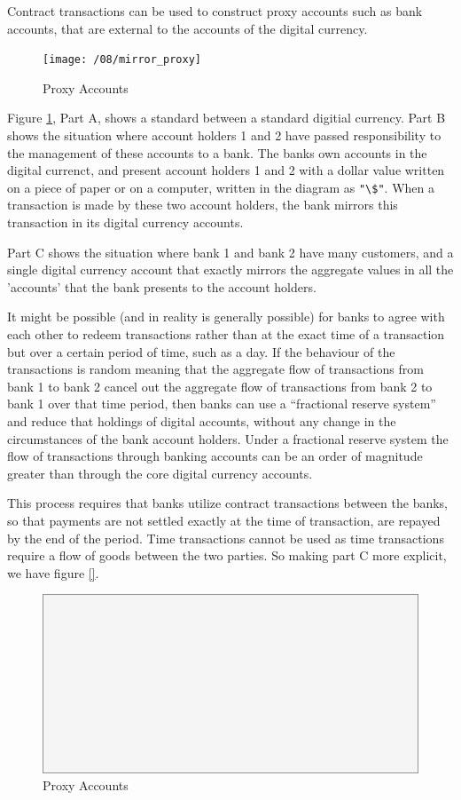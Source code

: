 Contract transactions can be used to construct proxy accounts such as bank accounts, that are
external to the accounts of the digital currency.

\begin{figure}[H]
\centering
\texttt{[image: /08/mirror\_proxy]}
\caption{Proxy Accounts}
\label{fig:mirror_proxy}
\end{figure}

Figure \ref{fig:mirror_proxy}, Part A, shows a standard between a standard digitial currency. Part B
shows the situation where account holders 1 and 2 have passed responsibility to the management of these
accounts to a bank. The banks own accounts in the digital currenct, and present account holders 1
and 2 with a dollar value written on a piece of paper or on a computer, written in the diagram as
\verb|"\$"|. When a transaction is made by these two account holders, the bank mirrors this
transaction in its digital currency accounts.

Part C shows the situation where bank 1 and bank 2 have many customers, and a single digital
currency account that exactly mirrors the aggregate values in all the 'accounts' that the bank
presents to the account holders. 

It might be possible (and in reality is generally possible) for banks to agree with each other to
redeem transactions rather than at the exact time of a transaction but over a certain period of
time, such as a day. If the behaviour of the transactions is random meaning that the aggregate flow
of transactions from bank 1 to bank 2 cancel out the aggregate flow of transactions from bank 2 to
bank 1 over that time period, then banks can use a ``fractional reserve system'' and reduce that
holdings of digital accounts, without any change in the circumstances of the bank account holders.
Under a fractional reserve system the flow of transactions through banking accounts can be an order
of magnitude greater than through the core digital currency accounts.

This process requires that banks utilize contract transactions between the banks, so that payments
are not settled exactly at the time of transaction, are repayed by the end of the period. Time
transactions cannot be used as time transactions require a flow of goods between the two parties. So
making part C more explicit, we have figure \ref{}.

\begin{figure}[H]
\centering
\includegraphics[scale=0.48]{blank}
\caption{Proxy Accounts}
\label{fig:proxy_accounts}
\end{figure}

